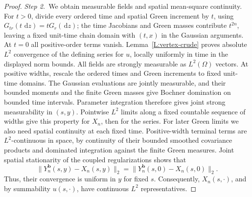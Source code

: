 \documentclass[12pt,oneside,openany]{book}
\numberwithin{equation}{section}
\theoremstyle{nogostyle}
\theoremstyle{definition}
\newcommand{\ud}{\,\mathrm{d}}
\begin{document}
\begin{proof}
  \medskip
  \noindent\textit{Step 2.~}We obtain measurable fields and spatial
  mean-square continuity.
  For $t>0$, divide every ordered time and spatial Green increment by $t$,
  using $G_{tr}(t\,\ud z)=tG_r(\ud z)$; the time Jacobians and Green masses
  contribute $t^{2n}$, leaving a fixed unit-time chain domain with $(t,x)$ in
  the Gaussian arguments. At $t=0$ all positive-order terms vanish.
  Lemma~\ref{L:vertex-crude} proves absolute $L^2$ convergence of the defining
  series for $u$, locally uniformly in time in the displayed norm bounds. All
  fields are strongly measurable as $L^2(\Omega)$ vectors. At positive widths,
  rescale the ordered times and Green increments to fixed unit-time domains. The
  Gaussian evaluations are jointly measurable, and their bounded moments and the
  finite Green masses give Bochner domination on bounded time intervals.
  Parameter integration therefore gives joint strong measurability in $(s,y)$.
  Pointwise $L^2$ limits along a fixed countable sequence of widths give this
  property for $X_n$, then for the series. For later Green limits we also need
  spatial continuity at each fixed time. Positive-width terminal terms are
  $L^2$-continuous in space, by continuity of their bounded smoothed covariance
  products and dominated integration against the finite Green measures. Joint
  spatial stationarity of the coupled regularizations shows that
  \[
    \|Y_n^{\boldsymbol b}(s,y)-X_n(s,y)\|_2
    =\|Y_n^{\boldsymbol b}(s,0)-X_n(s,0)\|_2.
  \]
  Thus, their convergence is uniform in $y$ for fixed $s$. Consequently,
  $X_n(s,\cdot)$, and by summability $u(s,\cdot)$, have continuous $L^2$
  representatives.



\end{proof}
\end{document}
